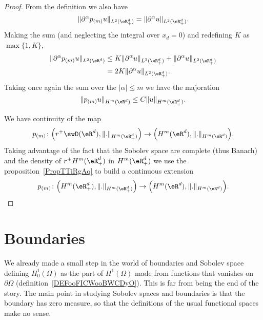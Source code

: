 \begin{proof}
	From the definition we also have
	\begin{equation}
		\| \partial^{\alpha}p_{(m)}u \|_{L^2(\eR^d_+)}=\| \partial^{\alpha}u \|_{L^2(\eR^d_+)}.
	\end{equation}
	Making the sum (and neglecting the integral over \( x_d=0\)) and redefining \(K \) as \( \max\{ 1,K \}\),
	\begin{subequations}
		\begin{align}
			\| \partial^{\alpha}p_{(m)}u \|_{L^2(\eR^d)} & \leq K \| \partial^{\alpha}u \|_{L^2(\eR^d_+)}+\| \partial^{\alpha}u \|_{L^2(\eR^d_+)} \\
			                                             & =2K\| \partial^{\alpha}u \|_{L^2(\eR^d_+)}.
		\end{align}
	\end{subequations}
	Taking once again the sum over the \( | \alpha |\leq m\) we have the majoration
	\begin{equation}
		\| p_{(m)}u \|_{H^m(\eR^d)}\leq C \| u \|_{H^m(\eR^d_+)}.
	\end{equation}

	We have continuity of the map
	\begin{equation}
		p_{(m)}\colon \Big( r^+\swD(\eR^d),\| . \|_{H^m(\eR^d_+)} \Big)\to \Big( H^m(\eR^d),\| . \|_{H^m(\eR^d)} \Big).
	\end{equation}
	Taking advantage of the fact that the Sobolev space are complete (thus Banach) and the density of \( r^+H^m(\eR^d_+)   \) in \( H^m(\eR^d_+)\) we use the proposition~\ref{PropTTiRgAq} to build a continuous extension
	\begin{equation}
		p_{(m)}\colon \Big(  H^m(\eR^d_+)  ,\| . \|_{H^m(\eR^d_+)} \Big)\to \Big( H^m(\eR^d),\| . \|_{H^m(\eR^d)} \Big).
	\end{equation}
\end{proof}

\section{Boundaries}

We already made a small step in the world of boundaries and Sobolev space defining \( H_0^1(\Omega)\) as the part of \( H^1(\Omega)\) made from functions that vanishes on \( \partial\Omega\) (definition~\ref{DEFooFICWooBWCDyO}). This is far from being the end of the story. The main point in studying Sobolev spaces and boundaries is that the boundary has zero measure, so that the definitions of the usual functional spaces make no sense.

